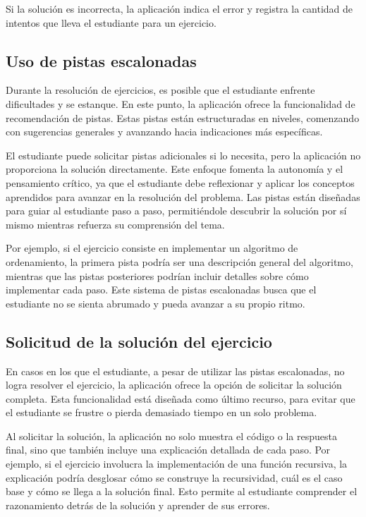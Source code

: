 \documentclass{article}
\begin{document}
Si la solución es incorrecta, la aplicación indica el error y registra la cantidad de intentos que lleva el estudiante para un ejercicio.

\subsection{Uso de pistas escalonadas}
Durante la resolución de ejercicios, es posible que el estudiante enfrente dificultades y se estanque. En este punto, la aplicación ofrece la funcionalidad de recomendación de pistas. Estas pistas están estructuradas en niveles, comenzando con sugerencias generales y avanzando hacia indicaciones más específicas.

El estudiante puede solicitar pistas adicionales si lo necesita, pero la aplicación no proporciona la solución directamente. Este enfoque fomenta la autonomía y el pensamiento crítico, ya que el estudiante debe reflexionar y aplicar los conceptos aprendidos para avanzar en la resolución del problema. Las pistas están diseñadas para guiar al estudiante paso a paso, permitiéndole descubrir la solución por sí mismo mientras refuerza su comprensión del tema.

Por ejemplo, si el ejercicio consiste en implementar un algoritmo de ordenamiento, la primera pista podría ser una descripción general del algoritmo, mientras que las pistas posteriores podrían incluir detalles sobre cómo implementar cada paso. Este sistema de pistas escalonadas busca que el estudiante no se sienta abrumado y pueda avanzar a su propio ritmo.

\subsection{Solicitud de la solución del ejercicio}
En casos en los que el estudiante, a pesar de utilizar las pistas escalonadas, no logra resolver el ejercicio, la aplicación ofrece la opción de solicitar la solución completa. Esta funcionalidad está diseñada como último recurso, para evitar que el estudiante se frustre o pierda demasiado tiempo en un solo problema.

Al solicitar la solución, la aplicación no solo muestra el código o la respuesta final, sino que también incluye una explicación detallada de cada paso. Por ejemplo, si el ejercicio involucra la implementación de una función recursiva, la explicación podría desglosar cómo se construye la recursividad, cuál es el caso base y cómo se llega a la solución final. Esto permite al estudiante comprender el razonamiento detrás de la solución y aprender de sus errores.
\end{document}
